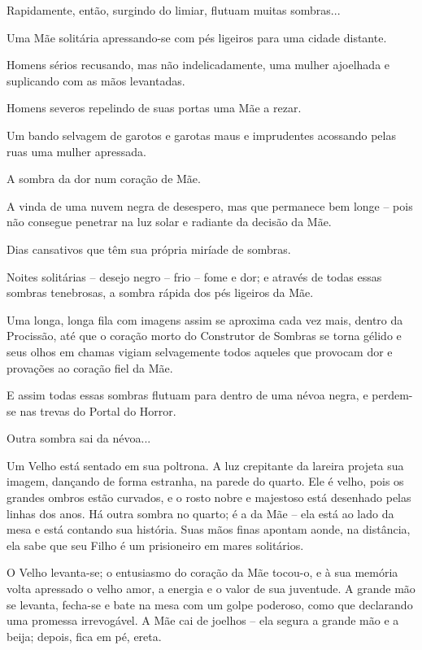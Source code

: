 \smallskip
Rapidamente, então, surgindo do limiar, flutuam muitas sombras...

\smallskip
Uma Mãe solitária apressando-se com pés ligeiros para uma cidade
distante.

\smallskip
Homens sérios recusando, mas não indelicadamente, uma mulher ajoelhada e
suplicando com as mãos levantadas.

\smallskip
Homens severos repelindo de suas portas uma Mãe a rezar.

\smallskip
Um bando selvagem de garotos e garotas maus e imprudentes acossando
pelas ruas uma mulher apressada.

\smallskip
A sombra da dor num coração de Mãe.

A vinda de uma nuvem negra de desespero, mas que permanece bem longe --
pois não consegue penetrar na luz solar e radiante da decisão da Mãe.

\smallskip
Dias cansativos que têm sua própria miríade de sombras.

\smallskip
Noites solitárias -- desejo negro -- frio -- fome e dor; e através de
todas essas sombras tenebrosas, a sombra rápida dos pés ligeiros da Mãe.

\smallskip
Uma longa, longa fila com imagens assim se aproxima cada vez mais,
dentro da Procissão, até que o coração morto do Construtor de Sombras se
torna gélido e seus olhos em chamas vigiam selvagemente todos aqueles
que provocam dor e provações ao coração fiel da Mãe.

E assim todas essas sombras flutuam para dentro de uma névoa negra, e
perdem-se nas trevas do Portal do Horror.

\smallskip
Outra sombra sai da névoa...

Um Velho está sentado em sua poltrona. A luz crepitante da lareira
projeta sua imagem, dançando de forma estranha, na parede do quarto. Ele
é velho, pois os grandes ombros estão curvados, e o rosto nobre e
majestoso está desenhado pelas linhas dos anos. Há outra sombra no
quarto; é a da Mãe -- ela está ao lado da mesa e está contando sua
história. Suas mãos finas apontam aonde, na distância, ela sabe que seu
Filho é um prisioneiro em mares solitários.

O Velho levanta-se; o entusiasmo do coração da Mãe tocou-o, e à sua
memória volta apressado o velho amor, a energia e o valor de sua
juventude. A grande mão se levanta, fecha-se e bate na mesa com um golpe
poderoso, como que declarando uma promessa irrevogável. A Mãe cai de
joelhos -- ela segura a grande mão e a beija; depois, fica em pé, ereta.

